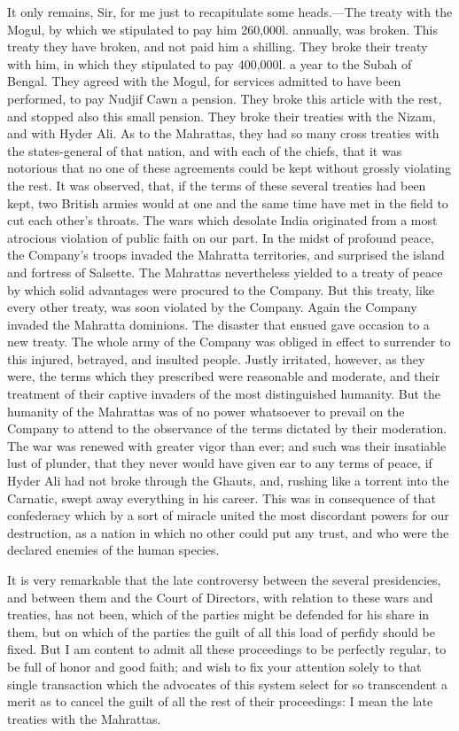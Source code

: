 It only remains, Sir, for me just to recapitulate some heads.—The treaty with the Mogul, by which we stipulated to pay him 260,000l. annually, was broken. This treaty they have broken, and not paid him a shilling. They broke their treaty with him, in which they stipulated to pay 400,000l. a year to the Subah of Bengal. They agreed with the Mogul, for services admitted to have been performed, to pay Nudjif Cawn a pension. They broke this article with the rest, and stopped also this small pension. They broke their treaties with the Nizam, and with Hyder Ali. As to the Mahrattas, they had so many cross treaties with the states-general of that nation, and with each of the chiefs, that it was notorious that no one of these agreements could be kept without grossly violating the rest. It was observed, that, if the terms of these several treaties had been kept, two British armies would at one and the same time have met in the field to cut each other's throats. The wars which desolate India originated from a most atrocious violation of public faith on our part. In the midst of profound peace, the Company's troops invaded the Mahratta territories, and surprised the island and fortress of Salsette. The Mahrattas nevertheless yielded to a treaty of peace by which solid advantages were procured to the Company. But this treaty, like every other treaty, was soon violated by the Company. Again the Company invaded the Mahratta dominions. The disaster that ensued gave occasion to a new treaty. The whole army of the Company was obliged in effect to surrender to this injured, betrayed, and insulted people. Justly irritated, however, as they were, the terms which they prescribed were reasonable and moderate, and their treatment of their captive invaders of the most distinguished humanity. But the humanity of the Mahrattas was of no power whatsoever to prevail on the Company to attend to the observance of the terms dictated by their moderation. The war was renewed with greater vigor than ever; and such was their insatiable lust of plunder, that they never would have given ear to any terms of peace, if Hyder Ali had not broke through the Ghauts, and, rushing like a torrent into the Carnatic, swept away everything in his career. This was in consequence of that confederacy which by a sort of miracle united the most discordant powers for our destruction, as a nation in which no other could put any trust, and who were the declared enemies of the human species.

It is very remarkable that the late controversy between the several presidencies, and between them and the Court of Directors, with relation to these wars and treaties, has not been, which of the parties might be defended for his share in them, but on which of the parties the guilt of all this load of perfidy should be fixed. But I am content to admit all these proceedings to be perfectly regular, to be full of honor and good faith; and wish to fix your attention solely to that single transaction which the advocates of this system select for so transcendent a merit as to cancel the guilt of all the rest of their proceedings: I mean the late treaties with the Mahrattas.

